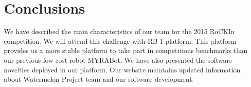 \documentclass[conference]{IEEEtran}
\begin{document}
%






\section{Conclusions}
\label{sec:conclusions}
We have described the main characteristics of our team for the 2015 RoCKIn competition. 
We will attend this challenge with RB-1 platform.
This platform provides us a more stable platform to take part in competitions benchmarks than our previous low-cost robot MYRABot.
We have also presented the software novelties deployed in our platform. 
Our website maintains updated information about Watermelon Project team and our software development.
\end{document}
